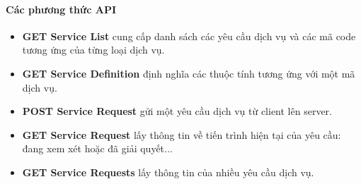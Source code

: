 \documentclass[a4paper]{article}
\begin{document}
\paragraph*{Các phương thức API}
\begin{itemize}
	\item \textbf{GET Service List} cung cấp danh sách các yêu cầu dịch vụ và các mã code tương ứng của từng loại dịch vụ.
	\item \textbf{GET Service Definition} định nghĩa các thuộc tính tương ứng với một mã dịch vụ.
	\item \textbf{POST Service Request} gửi một yêu cầu dịch vụ từ client lên server.
	\item \textbf{GET Service Request} lấy thông tin về tiến trình hiện tại của yêu cầu: đang xem xét hoặc đã giải quyết...
	\item \textbf{GET Service Requests} lấy thông tin của nhiều yêu cầu dịch vụ.
\end{itemize}
\end{document}
